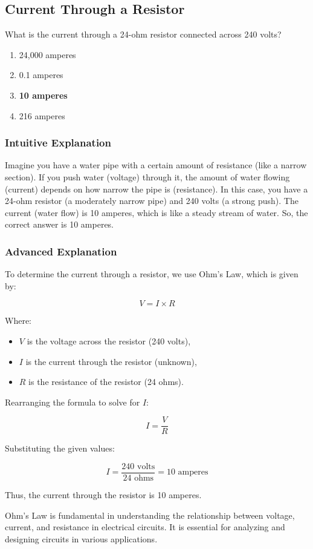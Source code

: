 \subsection{Current Through a Resistor}
\label{T5D09}

\begin{tcolorbox}[colback=gray!10!white,colframe=black!75!black,title=T5D09]
What is the current through a 24-ohm resistor connected across 240 volts?
\begin{enumerate}[label=\Alph*)]
    \item 24,000 amperes
    \item 0.1 amperes
    \item \textbf{10 amperes}
    \item 216 amperes
\end{enumerate}
\end{tcolorbox}

\subsubsection{Intuitive Explanation}
Imagine you have a water pipe with a certain amount of resistance (like a narrow section). If you push water (voltage) through it, the amount of water flowing (current) depends on how narrow the pipe is (resistance). In this case, you have a 24-ohm resistor (a moderately narrow pipe) and 240 volts (a strong push). The current (water flow) is 10 amperes, which is like a steady stream of water. So, the correct answer is 10 amperes.

\subsubsection{Advanced Explanation}
To determine the current through a resistor, we use Ohm's Law, which is given by:

\[
V = I \times R
\]

Where:
\begin{itemize}
    \item \( V \) is the voltage across the resistor (240 volts),
    \item \( I \) is the current through the resistor (unknown),
    \item \( R \) is the resistance of the resistor (24 ohms).
\end{itemize}

Rearranging the formula to solve for \( I \):

\[
I = \frac{V}{R}
\]

Substituting the given values:

\[
I = \frac{240 \text{ volts}}{24 \text{ ohms}} = 10 \text{ amperes}
\]

Thus, the current through the resistor is 10 amperes.

Ohm's Law is fundamental in understanding the relationship between voltage, current, and resistance in electrical circuits. It is essential for analyzing and designing circuits in various applications.

